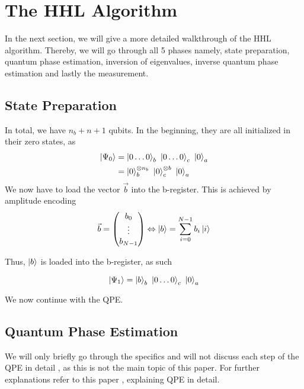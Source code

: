 \section{The HHL Algorithm}
In the next section, we will give a more detailed walkthrough of the HHL algorithm.
Thereby, we will go through all 5 phases namely, state preparation, quantum phase estimation, inversion of eigenvalues, inverse quantum phase estimation and lastly the measurement.

\subsection{State Preparation}

In total, we have $n_b + n + 1$ qubits. 
In the beginning, they are all initialized in their zero states, as
\begin{equation}
\begin{split}
\ket{\Psi_0} &= \ket{0\dots0}_b\ \ket{0\dots0}_c\ \ket{0}_a \\
&= \ket{0}_b^{{\otimes n_b}}\ \ket{0}_c^{\otimes b}\ \ket{0}_a 
\end{split}
\end{equation}
We now have to load the vector $\vec{b}$ into the b-register. 
This is achieved by amplitude encoding
\begin{equation}
    \vec{b} = \begin{pmatrix} b_0\\ \vdots \\ b_{N-1} \end{pmatrix} 
    \Leftrightarrow  
     \ket b = \sum_{i=0}^{N-1} b_i \ket i
\end{equation}

Thus, $\ket b$ is loaded into the b-register, as such

\begin{equation}
\ket{\Psi_1} = \ket{b}_b\ \ket{0\dots0}_c\ \ket{0}_a
\end{equation}

We now continue with the QPE. 

\subsection{Quantum Phase Estimation}
We will only briefly go through the specifics  and will not discuss each step of the QPE in detail , as this is not the main topic of this paper. 
For further explanations refer to this paper \cite{qpe}, explaining QPE in detail.

